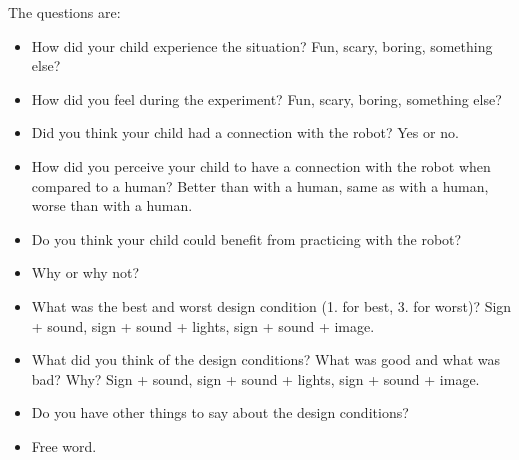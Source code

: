 The questions are:
\begin{itemize}
  \item How did your child experience the situation? Fun, scary, boring, something else?
  \item How did you feel during the experiment? Fun, scary, boring, something else?
  \item Did you think your child had a connection with the robot? Yes or no.
  \item How did you perceive your child to have a connection with the robot when compared to a human? Better than with a human, same as with a human, worse than with a human.
  \item Do you think your child could benefit from practicing with the robot?
  \item Why or why not?
  \item What was the best and worst design condition (1. for best, 3. for worst)? Sign + sound, sign + sound + lights, sign + sound + image.
  \item What did you think of the design conditions? What was good and what was bad? Why? Sign + sound, sign + sound + lights, sign + sound + image.
  \item Do you have other things to say about the design conditions?
  \item Free word.
\end{itemize}






